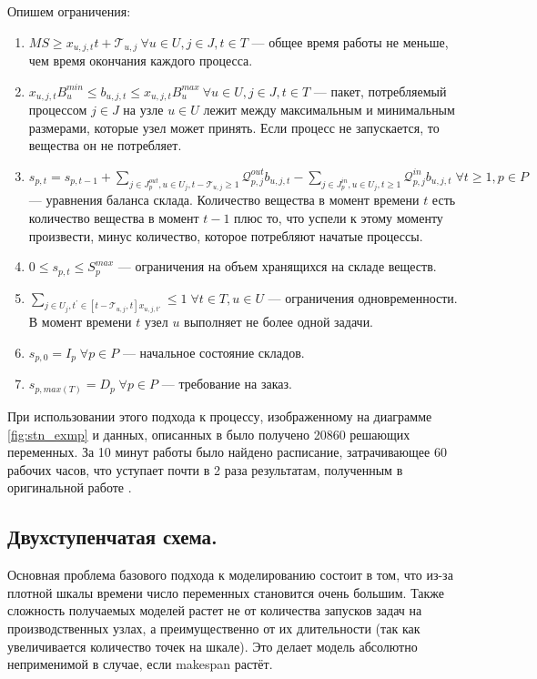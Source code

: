\documentclass[12pt, twoside]{article}
\theoremstyle{definition}
\newcommand{\Tau}{\mathcal{T}}
\begin{document}
Опишем ограничения:

\begin{enumerate}
	\item $MS \geq x_{u, j, t}t + \Tau_{u, j} \: \forall u \in U, j \in J, t \in T$ --- общее время работы не меньше, чем время окончания каждого процесса.
	\item $x_{u, j, t}B^{min}_u \leq b_{u, j, t} \leq x_{u, j, t}B^{max}_u \: \forall u \in U, j \in J, t \in T$ --- пакет, потребляемый процессом $j \in J$ на узле $u \in U$ лежит между максимальным и минимальным размерами, которые узел может принять. Если процесс не запускается, то вещества он не потребляет.
	\item $s_{p, t} = s_{p, t-1} + \displaystyle\sum_{j \in J^{out}_p, u \in U_j, t - \Tau_{u, j} \geq 1} \mathcal{Q}^{out}_{p, j}b_{u, j, t} - \displaystyle\sum_{j \in J^{in}_p, u \in U_j, t \geq 1} \mathcal{Q}^{in}_{p, j}b_{u, j, t} \; \forall t \geq 1, p \in P$ --- уравнения баланса склада. Количество вещества в момент времени $t$ есть количество вещества в момент $t-1$ плюс то, что успели к этому моменту произвести, минус количество, которое потребляют начатые процессы.
	\item $0 \leq s_{p, t} \leq S^{max}_p$ --- ограничения на объем хранящихся на складе веществ.
	\item $\displaystyle\sum_{j \in U_j, t^{'} \in [t-\Tau_{u, j}, t] x_{u, j, t'}} \leq 1 \; \forall t \in T, u \in U$ --- ограничения одновременности. В момент времени $t$ узел $u$ выполняет не более одной задачи.
	\item $s_{p, 0} = I_p \; \forall p \in P$ --- начальное состояние складов.
	\item $s_{p, max(T)} = D_p \; \forall p \in P$ --- требование на заказ.
\end{enumerate}

При использовании этого подхода к процессу, изображенному на диаграмме \ref{fig:stn_exmp} и данных, описанных в \cite{discretetime} было получено 20860 решающих переменных. За 10 минут работы было найдено расписание, затрачивающее 60 рабочих часов, что уступает почти в 2 раза результатам, полученным в оригинальной работе \cite{discretetime}.

\subsection{Двухступенчатая схема.}

Основная проблема базового подхода к моделированию состоит в том, что из-за плотной шкалы времени число переменных становится очень большим. Также сложность получаемых моделей растет не от количества запусков задач на производственных узлах, а преимущественно от их длительности (так как увеличивается количество точек на шкале). Это делает модель абсолютно неприменимой в случае, если makespan растёт.
\end{document}
